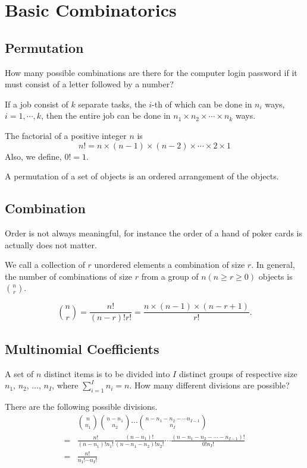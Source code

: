 \section{Basic Combinatorics}
\subsection{Permutation}
How many possible combinations are there for the computer login password if it must consist of a letter followed by a number?

If a job consist of $k$ separate tasks, the $i$-th of which can be done in $n_i$ ways, $i = 1, \cdots, k$, then the entire job can be done in $n_1 \times n_2 \times \cdots \times n_k$ ways.

\begin{definition}[Factorial]
	The factorial of a positive integer $n$ is 
	\[n! = n \times (n-1) \times (n - 2) \times \cdots \times 2 \times 1\]
	Also, we define, $0! = 1$.
\end{definition}

\begin{definition}[Permutation]
A permutation of a set of objects is an ordered arrangement of the objects.
\end{definition}

\subsection{Combination}
Order is not always meaningful, for instance the order of a hand of poker cards is actually does not matter.

\begin{definition}[Combination]
We call a collection of $r$ unordered elements a combination of size $r$. In general, the number of combinations of size $r$ from a group of $n (n \ge r \ge 0)$ objects is ${n \choose r}$.

\[{n \choose r} = \frac{n!}{(n-r)!r!} = \frac{n \times (n - 1) \times (n - r + 1)}{r!}.\]
\end{definition}

\subsection{Multinomial Coefficients}
A set of $n$ distinct items is to be divided into $I$ distinct groups of respective size $n_1$, $n_2$, $\dots$, $n_I$, where $\sum_{i=1}^{I} n_i = n$. How many different divisions are possible?

There are the following possible divisions.
\begin{align*}
	&{n \choose n_1} {n-n_1 \choose n_2}\cdots{n -n_1 -n_2 - \cdots n_{I-1} \choose n_I}\\
	=&\frac{n!}{(n-n_1)!n_1!} 
	\frac{(n-n_1)!}{(n - n_1 - n_2)!n_2!}
	\cdots
	\frac{(n - n_1 - n_2 - \cdots - n_{I-1})!}{0!n_I!}\\
	=& \frac{n!}{n_1! \cdots n_I!}
\end{align*}


